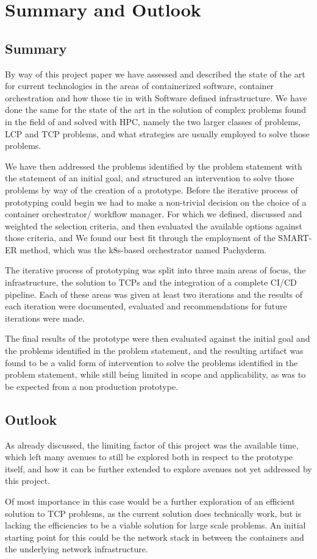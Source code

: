 \chapter{Summary and Outlook}
\label{summary}
 
\section{Summary}

By way of this project paper we have assessed and described the state of the art for current technologies in the areas of 
containerized software, container orchestration and how those tie in with Software defined infrastructure.
We have done the same for the state of the art in the solution of complex problems found in the field of and  solved with \ac{HPC},
namely the two larger classes of problems, \ac{LCP} and \ac{TCP} problems, and what strategies are usually employed to solve those problems.

We have then addressed the problems identified by the problem statement with the statement of an initial goal, 
and structured an intervention to solve those problems by way of the creation of a prototype.
Before the iterative process of prototyping could begin we had to make a non-trivial decision on the choice of a container orchestrator/ workflow manager.
For which we defined, discussed and weighted the selection criteria, and then evaluated the available options against those criteria, and 
We found our best fit through the employment of the \ac{SMART-ER} method, which was the \ac{k8s}-based orchestrator named Pachyderm.

The iterative process of prototyping was split into three main areas of focus, the infrastructure, the solution to \acp{TCP} and the integration of a complete 
\ac{CI/CD} pipeline. Each of these areas was given at least two iterations and the results of each iteration were documented, evaluated and recommendations for
future iterations were made.

The final results of the prototype were then evaluated against the initial goal and the problems identified in the problem statement,
and the resulting artifact was found to be a valid form of intervention to solve the problems identified in the problem statement,
while still being limited in scope and applicability, as was to be expected from a non production prototype. 


\section{Outlook}

As already discussed, the limiting factor of this project was the available time, which left many avenues to still be explored
both in respect to the prototype itself, and how it can be further extended to explore avenues not yet addressed by this project.

Of most importance in this case would be a further exploration of an efficient solution to \ac{TCP} problems, 
as the current solution does technically work, but is lacking the efficiencies to be a viable solution for large scale problems.
An initial starting point for this could be the network stack in between the containers and the underlying network infrastructure.
